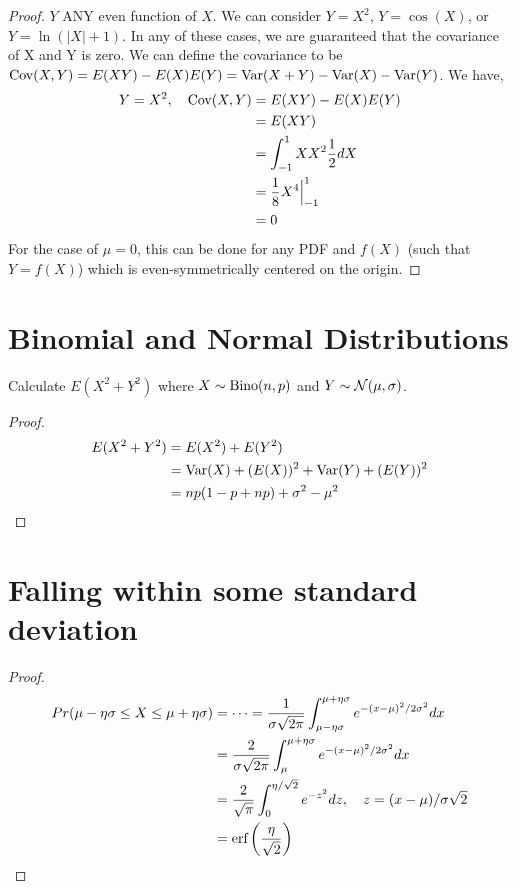 \documentclass{article}
\begin{document}
\begin{enumerate}[label=\roman*)]
\begin{proof}
                $Y$ ANY even function of $X$. We can consider $Y = X^2$, $Y =
                \cos(X)$, or $Y = \ln(|X| + 1)$. In any of these cases, we are
                guaranteed that the covariance of X and Y is zero. We can define
                the covariance to be $\text{Cov}(X,Y) = E(XY) - E(X)E(Y) = \text{Var}(X + Y) -
                \text{Var}(X) - \text{Var}(Y)$. We have, 
                \begin{align*}
                    Y = X^2, \quad \text{Cov}(X,Y) &= E(XY) - E(X)E(Y)\\
                    &= E(XY) \\
                    &= \int_{-1}^1 XX^2\frac{1}{2}dX\\
                    &= \frac{1}{8}X^4\Big|_{-1}^1\\
                    &= 0 
                \end{align*}
                For the case of $\mu = 0$, this can be done for any PDF and
                $f(X)$ (such that $Y = f(X)$)  which is even-symmetrically centered on
                the origin. 
            \end{proof}
    \end{enumerate}

\section{Binomial and Normal Distributions}
    Calculate $E(X^2 + Y^2)$ where $X \sim \text{Bino}(n, p)$ and $Y \sim
    \mathcal{N}(\mu,\sigma)$. 
    \begin{proof}
        \begin{align*}
            E(X^2 + Y^2) &= E(X^2) + E(Y^2)\\
            &= \text{Var}(X) + (E(X))^2 + \text{Var}(Y) + (E(Y))^2\\
            &= np(1-p+np) + \sigma^2 - \mu^2
        \end{align*}
    \end{proof}

\section{Falling within some standard deviation}
    \begin{proof}
        \begin{align*}
            Pr(\mu - \eta\sigma \le X \le \mu + \eta\sigma) &= \cdots = 
            \frac{1}{\sigma\sqrt{2\pi}}\int_{\mu -
            \eta\sigma}^{\mu + \eta\sigma} e^{-(x-\mu)^2/2\sigma^2}dx\\
            &= \frac{2}{\sigma\sqrt{2\pi}}\int_{\mu}
            ^{\mu + \eta\sigma} e^{-(x-\mu)^2/2\sigma^2}dx\\
            &= \frac{2}{\sqrt{\pi}} \int_0^{\eta/\sqrt{2}}e^{-z^2}dz,\quad z = (x -
            \mu)/\sigma\sqrt{2}\\
            &= \text{erf}\left(\frac{\eta}{\sqrt{2}}\right)
        \end{align*}
    \end{proof}
\end{document}
